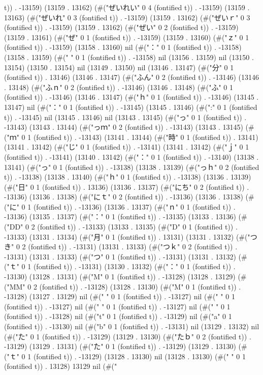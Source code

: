 t)) . -13159) (13159 . 13162) (#("ぜいれい" 0 4 (fontified t)) . -13159) (13159 . 13163) (#("ぜいれ" 0 3 (fontified t)) . -13159) (13159 . 13162) (#("ぜいｒ" 0 3 (fontified t)) . -13159) (13159 . 13162) (#("ぜい" 0 2 (fontified t)) . -13159) (13159 . 13161) (#("ぜ" 0 1 (fontified t)) . -13159) (13159 . 13160) (#("ｚ" 0 1 (fontified t)) . -13159) (13158 . 13160) nil (#("：" 0 1 (fontified t)) . -13158) (13158 . 13159) (#(" " 0 1 (fontified t)) . -13158) nil (13156 . 13159) nil (13150 . 13154) (13150 . 13154) nil (13149 . 13150) nil (13146 . 13147) (#("分" 0 1 (fontified t)) . 13146) (13146 . 13147) (#("ふん" 0 2 (fontified t)) . -13146) (13146 . 13148) (#("ふｎ" 0 2 (fontified t)) . -13146) (13146 . 13148) (#("ふ" 0 1 (fontified t)) . -13146) (13146 . 13147) (#("ｈ" 0 1 (fontified t)) . -13146) (13145 . 13147) nil (#("：" 0 1 (fontified t)) . -13145) (13145 . 13146) (#(":" 0 1 (fontified t)) . -13145) nil (13145 . 13146) nil (13143 . 13145) (#("っ" 0 1 (fontified t)) . -13143) (13143 . 13144) (#("っｍ" 0 2 (fontified t)) . -13143) (13143 . 13145) (#("ｍ" 0 1 (fontified t)) . -13143) (13141 . 13144) (#("時" 0 1 (fontified t)) . 13141) (13141 . 13142) (#("じ" 0 1 (fontified t)) . -13141) (13141 . 13142) (#("ｊ" 0 1 (fontified t)) . -13141) (13140 . 13142) (#("：" 0 1 (fontified t)) . -13140) (13138 . 13141) (#("っ" 0 1 (fontified t)) . -13138) (13138 . 13139) (#("っｈ" 0 2 (fontified t)) . -13138) (13138 . 13140) (#("ｈ" 0 1 (fontified t)) . -13138) (13136 . 13139) (#("日" 0 1 (fontified t)) . 13136) (13136 . 13137) (#("にち" 0 2 (fontified t)) . -13136) (13136 . 13138) (#("にｔ" 0 2 (fontified t)) . -13136) (13136 . 13138) (#("に" 0 1 (fontified t)) . -13136) (13136 . 13137) (#("ｎ" 0 1 (fontified t)) . -13136) (13135 . 13137) (#("：" 0 1 (fontified t)) . -13135) (13133 . 13136) (#("DD" 0 2 (fontified t)) . -13133) (13133 . 13135) (#("D" 0 1 (fontified t)) . -13133) (13131 . 13134) (#("月" 0 1 (fontified t)) . 13131) (13131 . 13132) (#("つき" 0 2 (fontified t)) . -13131) (13131 . 13133) (#("つｋ" 0 2 (fontified t)) . -13131) (13131 . 13133) (#("つ" 0 1 (fontified t)) . -13131) (13131 . 13132) (#("ｔ" 0 1 (fontified t)) . -13131) (13130 . 13132) (#("：" 0 1 (fontified t)) . -13130) (13128 . 13131) (#("M" 0 1 (fontified t)) . -13128) (13128 . 13129) (#("MM" 0 2 (fontified t)) . -13128) (13128 . 13130) (#("M" 0 1 (fontified t)) . -13128) (13127 . 13129) nil (#("	" 0 1 (fontified t)) . -13127) nil (#("
" 0 1 (fontified t)) . -13127) nil (#("
" 0 1 (fontified t)) . -13127) nil (#("	" 0 1 (fontified t)) . -13128) nil (#("t" 0 1 (fontified t)) . -13129) nil (#("a" 0 1 (fontified t)) . -13130) nil (#("b" 0 1 (fontified t)) . -13131) nil (13129 . 13132) nil (#("た" 0 1 (fontified t)) . -13129) (13129 . 13130) (#("たｂ" 0 2 (fontified t)) . -13129) (13129 . 13131) (#("た" 0 1 (fontified t)) . -13129) (13129 . 13130) (#("ｔ" 0 1 (fontified t)) . -13129) (13128 . 13130) nil (13128 . 13130) (#("	" 0 1 (fontified t)) . 13128) 13129 nil (#("
